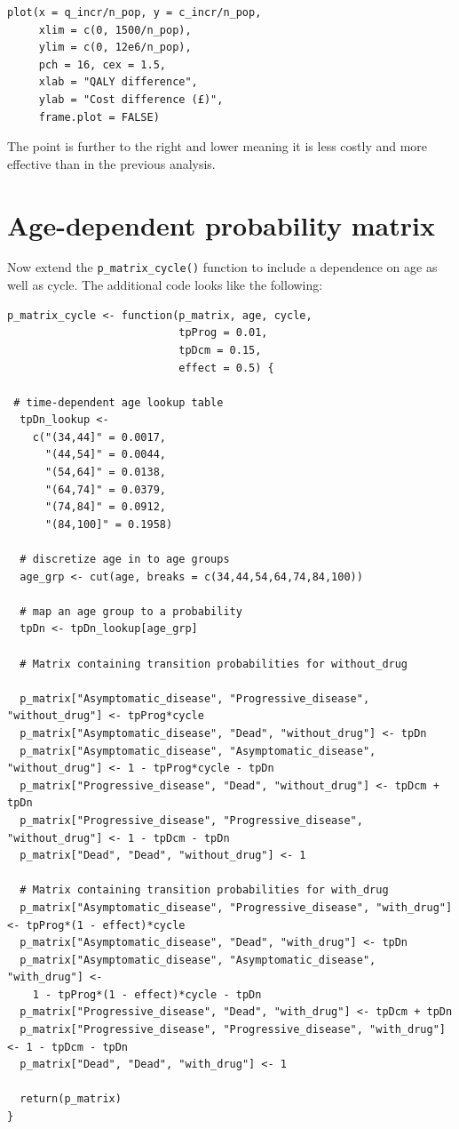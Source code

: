 \documentclass[a4paper,twoside,openany]{../svmonoBUGS}\usepackage[]{graphicx}\usepackage[]{color}
\begin{document}
\begin{verbatim}
plot(x = q_incr/n_pop, y = c_incr/n_pop,
     xlim = c(0, 1500/n_pop),
     ylim = c(0, 12e6/n_pop),
     pch = 16, cex = 1.5,
     xlab = "QALY difference",
     ylab = "Cost difference (£)",
     frame.plot = FALSE)
\end{verbatim}

The point is further to the right and lower meaning it is less costly and more effective than in the previous analysis.


\section{Age-dependent probability matrix}
Now extend the \texttt{p\_matrix\_cycle()} function to include a dependence on age as well as cycle.
The additional code looks like the following:

\begin{verbatim}
p_matrix_cycle <- function(p_matrix, age, cycle,
                           tpProg = 0.01,
                           tpDcm = 0.15,
                           effect = 0.5) {
  
 # time-dependent age lookup table
  tpDn_lookup <-
    c("(34,44]" = 0.0017,
      "(44,54]" = 0.0044,
      "(54,64]" = 0.0138,
      "(64,74]" = 0.0379,
      "(74,84]" = 0.0912,
      "(84,100]" = 0.1958)
  
  # discretize age in to age groups
  age_grp <- cut(age, breaks = c(34,44,54,64,74,84,100))
  
  # map an age group to a probability
  tpDn <- tpDn_lookup[age_grp]
  
  # Matrix containing transition probabilities for without_drug
  
  p_matrix["Asymptomatic_disease", "Progressive_disease", "without_drug"] <- tpProg*cycle
  p_matrix["Asymptomatic_disease", "Dead", "without_drug"] <- tpDn
  p_matrix["Asymptomatic_disease", "Asymptomatic_disease", "without_drug"] <- 1 - tpProg*cycle - tpDn
  p_matrix["Progressive_disease", "Dead", "without_drug"] <- tpDcm + tpDn
  p_matrix["Progressive_disease", "Progressive_disease", "without_drug"] <- 1 - tpDcm - tpDn
  p_matrix["Dead", "Dead", "without_drug"] <- 1
  
  # Matrix containing transition probabilities for with_drug
  p_matrix["Asymptomatic_disease", "Progressive_disease", "with_drug"] <- tpProg*(1 - effect)*cycle
  p_matrix["Asymptomatic_disease", "Dead", "with_drug"] <- tpDn
  p_matrix["Asymptomatic_disease", "Asymptomatic_disease", "with_drug"] <-
    1 - tpProg*(1 - effect)*cycle - tpDn
  p_matrix["Progressive_disease", "Dead", "with_drug"] <- tpDcm + tpDn
  p_matrix["Progressive_disease", "Progressive_disease", "with_drug"] <- 1 - tpDcm - tpDn
  p_matrix["Dead", "Dead", "with_drug"] <- 1
  
  return(p_matrix)
}
\end{verbatim}
\end{document}
